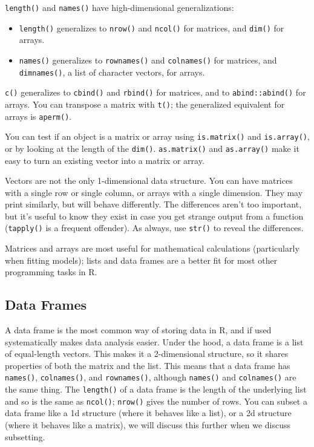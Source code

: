 \documentclass[]{book}
\theoremstyle{definition}
\theoremstyle{definition}
\theoremstyle{definition}
\theoremstyle{remark}
\begin{document}
\texttt{length()} and \texttt{names()} have high-dimensional
generalizations:

\begin{itemize}
\item
  \texttt{length()} generalizes to \texttt{nrow()} and \texttt{ncol()}
  for matrices, and \texttt{dim()} for arrays.
\item
  \texttt{names()} generalizes to \texttt{rownames()} and
  \texttt{colnames()} for matrices, and \texttt{dimnames()}, a list of
  character vectors, for arrays.
\end{itemize}

\texttt{c()} generalizes to \texttt{cbind()} and \texttt{rbind()} for
matrices, and to \texttt{abind::abind()} for arrays. You can transpose a
matrix with \texttt{t()}; the generalized equivalent for arrays is
\texttt{aperm()}.

You can test if an object is a matrix or array using
\texttt{is.matrix()} and \texttt{is.array()}, or by looking at the
length of the \texttt{dim()}. \texttt{as.matrix()} and
\texttt{as.array()} make it easy to turn an existing vector into a
matrix or array.

Vectors are not the only 1-dimensional data structure. You can have
matrices with a single row or single column, or arrays with a single
dimension. They may print similarly, but will behave differently. The
differences aren't too important, but it's useful to know they exist in
case you get strange output from a function (\texttt{tapply()} is a
frequent offender). As always, use \texttt{str()} to reveal the
differences.

Matrices and arrays are most useful for mathematical calculations
(particularly when fitting models); lists and data frames are a better
fit for most other programming tasks in R.

\hypertarget{data-frames}{%
\subsection{Data Frames}\label{data-frames}}

A data frame is the most common way of storing data in R, and if used
systematically makes data analysis easier. Under the hood, a data frame
is a list of equal-length vectors. This makes it a 2-dimensional
structure, so it shares properties of both the matrix and the list. This
means that a data frame has \texttt{names()}, \texttt{colnames()}, and
\texttt{rownames()}, although \texttt{names()} and \texttt{colnames()}
are the same thing. The \texttt{length()} of a data frame is the length
of the underlying list and so is the same as \texttt{ncol()};
\texttt{nrow()} gives the number of rows. You can subset a data frame
like a 1d structure (where it behaves like a list), or a 2d structure
(where it behaves like a matrix), we will discuss this further when we
discuss subsetting.
\end{document}
